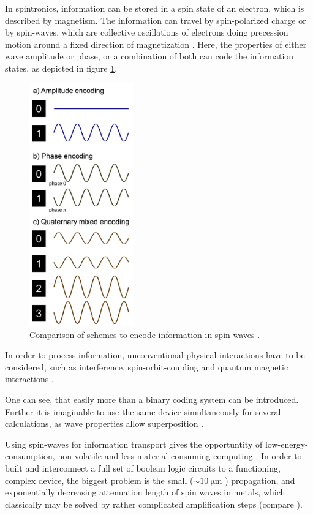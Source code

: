 In spintronics, information can be stored in a spin state of an electron, which is described by magnetism.
The information can travel by spin-polarized charge or by spin-waves, which are collective oscillations of electrons doing precession motion around a fixed direction of magnetization \cite{clocks}.
Here, the properties of either wave amplitude or phase, or a combination of both can code the information states, as depicted in figure \ref{fig:spin-coding}.

\begin{figure}
  \captionsetup{width=0.9\linewidth}
  \includegraphics[width=0.4\textwidth]{graphics/spin-code.png}
  \caption{Comparison of schemes to encode information in spin-waves \cite{computing}.}  
  \label{fig:spin-coding}
\end{figure}

In order to process information, unconventional physical interactions have to be considered, such as interference, spin-orbit-coupling and quantum magnetic interactions \cite{perovskite}.

One can see, that easily more than a binary coding system can be introduced. 
Further it is imaginable to use the same device simultaneously for several calculations, as wave properties allow superposition \cite{computing}.

Using spin-waves for information transport gives the opportuntity of low-energy-consumption, non-volatile and less material consuming computing \cite{clocks}. 
In order to built and interconnect a full set of boolean logic circuits to a functioning, complex device, the biggest problem is the small ($\sim\SI{10}{\micro\meter}$ \cite{computing}) propagation, and exponentially decreasing attenuation length of spin waves in metals, which classically may be solved by rather complicated amplification steps (compare \cite{clocks}).

